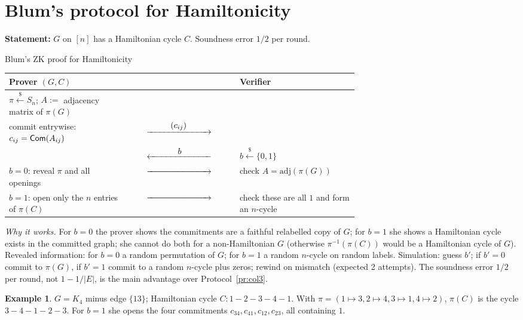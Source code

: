 \documentclass[11pt,a4paper]{report}
\makeatletter
\theoremstyle{plain}
\theoremstyle{definition}
\newtheorem{example}[theorem]{Example}
\theoremstyle{remark}
\newcommand{\getsr}{\xleftarrow{\$}}
\newcommand{\ra}[1]{\xrightarrow{\makebox[2.5cm]{$#1$}}}
\newcommand{\la}[1]{\xleftarrow{\makebox[2.5cm]{$#1$}}}
\newcommand{\inv}{^{-1}}
\newenvironment{flow}[2]{%
  \par\smallskip\noindent
  \begin{tabular}{@{}L{0.34\linewidth} c L{0.34\linewidth}@{}}
  \textbf{#1} & & \textbf{#2}\\ \hline}{\end{tabular}\par\smallskip}
\makeatother
\begin{document}
\section{Blum's protocol for Hamiltonicity}
\textbf{Statement:} $G$ on $[n]$ has a Hamiltonian cycle $C$. Soundness error $1/2$ per round.
\begin{protocol}[label=pr:blum]{Blum's ZK proof for Hamiltonicity}
\begin{flow}{Prover $(G,C)$}{Verifier}
$\pi\getsr S_n$; $A:=$ adjacency matrix of $\pi(G)$ & & \\
commit entrywise: $c_{ij}=\mathsf{Com}(A_{ij})$ & $\ra{(c_{ij})}$ & \\
 & $\la{b}$ & $b\getsr\{0,1\}$\\
$b=0$: reveal $\pi$ and all openings & $\ra{}$ & check $A=\mathrm{adj}(\pi(G))$\\
$b=1$: open only the $n$ entries of $\pi(C)$ & $\ra{}$ & check these are all $1$ and form an $n$-cycle
\end{flow}
\end{protocol}
\emph{Why it works.} For $b=0$ the prover shows the commitments are a faithful relabelled copy of $G$; for $b=1$ she shows a Hamiltonian cycle exists in the committed graph; she cannot do both for a non-Hamiltonian $G$ (otherwise $\pi\inv(\pi(C))$ would be a Hamiltonian cycle of $G$). Revealed information: for $b=0$ a random permutation of $G$; for $b=1$ a random $n$-cycle on random labels. Simulation: guess $b'$; if $b'=0$ commit to $\pi(G)$, if $b'=1$ commit to a random $n$-cycle plus zeros; rewind on mismatch (expected 2 attempts). The soundness error $1/2$ per round, not $1-1/|E|$, is the main advantage over Protocol~\ref{pr:col3}.
\begin{example}
$G=K_4$ minus edge $\{13\}$; Hamiltonian cycle $C:1\!-\!2\!-\!3\!-\!4\!-\!1$. With $\pi=(1\mapsto3,2\mapsto4,3\mapsto1,4\mapsto2)$, $\pi(C)$ is the cycle $3\!-\!4\!-\!1\!-\!2\!-\!3$. For $b=1$ she opens the four commitments $c_{34},c_{41},c_{12},c_{23}$, all containing $1$.
\end{example}
\end{document}
